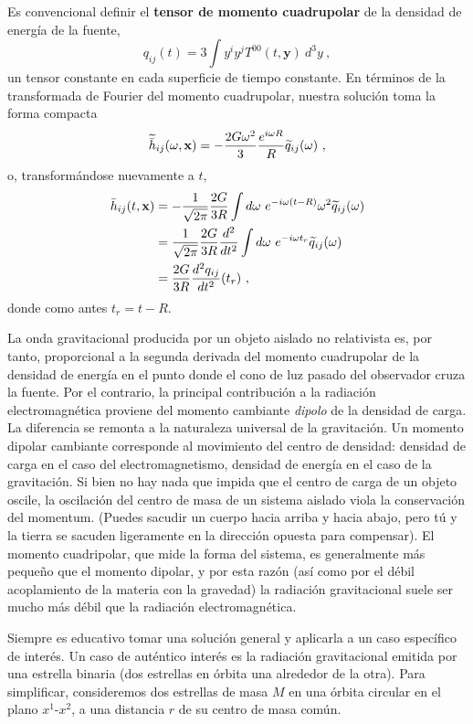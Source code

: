 \documentclass[11pt,b5paper,openany,twoside]{book}
\def\bh{{\bar h}}
\def\x{\mathbf{x}}
\def\y{\mathbf{y}}
\begin{document}
Es convencional definir el {\bf tensor de momento cuadrupolar} de la densidad de energía de la fuente,
\begin{equation}
q_{ij}(t) = 3\int y^i y^j T^{00}(t,\y)~d^3y\ ,\label{6.83}
\end{equation}
un tensor constante en cada superficie de tiempo constante.
En términos de la transformada de Fourier del momento cuadrupolar, nuestra solución toma la forma compacta
\begin{equation}
\widetilde\bh_{ij}(\omega,\x) = -{{2G\omega^2}\over 3}
{{e^{i\omega R}}\over R} \widetilde q_{ij}(\omega)\ ,\label{6.84}
\end{equation}
o, transformándose nuevamente a $t$,
\begin{align}
\bh_{ij}(t,\x)  &=  -{1\over{\sqrt{2\pi}}}{{2G}\over {3R}}
\int d\omega~e^{-i\omega(t-R)}\omega^2\widetilde q_{ij}(\omega) \notag \\
&=  {1\over{\sqrt{2\pi}}}{{2G}\over {3R}}{{d^2}\over{dt^2}}
\int d\omega~e^{-i\omega t_r}\widetilde q_{ij}(\omega) \notag \\
&=  {{2G}\over {3R}}{{d^2 q_{ij}}\over{dt^2}}(t_r) \ , \label{6.85}
\end{align}
donde como antes $t_r = t-R$.

La onda gravitacional producida por un objeto aislado no relativista es, por tanto, proporcional a la segunda derivada del momento cuadrupolar de la densidad de energía en el punto donde el cono de luz pasado del observador cruza la fuente.
Por el contrario, la principal contribución a la radiación electromagnética proviene del momento cambiante {\it dipolo} de la densidad de carga.
La diferencia se remonta a la naturaleza universal de la gravitación.
Un momento dipolar cambiante corresponde al movimiento del centro de densidad: densidad de carga en el caso del electromagnetismo, densidad de energía en el caso de la gravitación.
Si bien no hay nada que impida que el centro de carga de un objeto oscile, la oscilación del centro de masa de un sistema aislado viola la conservación del momentum.
(Puedes sacudir un cuerpo hacia arriba y hacia abajo, pero tú y la tierra se sacuden ligeramente en la dirección opuesta para compensar).
El momento cuadripolar, que mide la forma del sistema, es generalmente más pequeño que el momento dipolar, y por esta razón (así como por el débil acoplamiento de la materia con la gravedad) la radiación gravitacional suele ser mucho más débil que la radiación electromagnética.

Siempre es educativo tomar una solución general y aplicarla a un caso específico de interés.
Un caso de auténtico interés es la radiación gravitacional emitida por una estrella binaria (dos estrellas en órbita una alrededor de la otra).
Para simplificar, consideremos dos estrellas de masa $M$ en una órbita circular en el plano $x^1$-$x^2$, a una distancia $r$ de su centro de masa común.
\end{document}
